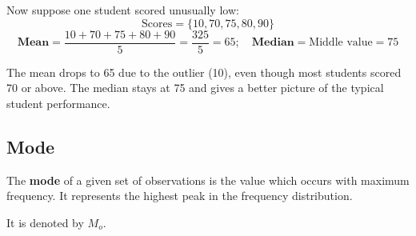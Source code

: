\documentclass[twoside]{book}
\begin{document}
Now suppose one student scored unusually low:
\[
\text{Scores} = \{10, 70, 75, 80, 90\}
\]
\[\textbf{Mean} = \frac{10 + 70 + 75 + 80 + 90}{5} = \frac{325}{5} = 65; \quad \textbf{Median} = \text{Middle value} = 75
\]

The mean drops to 65 due to the outlier (10), even though most students scored 70 or above. The median stays at 75 and gives a better picture of the typical student performance.

\subsection{Mode}
\begin{textbox}
The \textbf{mode} of a given set of observations is the value which occurs with maximum frequency. It represents the highest peak in the frequency distribution. 
    \end{textbox}

It is denoted by \( M_o \).
\end{document}
